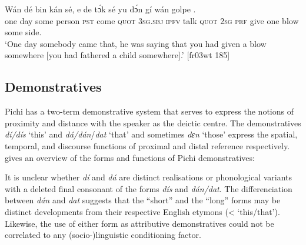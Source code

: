 \ea%
    \label{ex:key:191}
    \gll Wán    dé     bin  kán    sé,    e    de
tɔ́k  sé    yu  dɔ́n  gí  wán    golpe   .\\
one    day  some  person  \textsc{pst}  come  \textsc{quot}    \textsc{3sg.sbj}  \textsc{ipfv}
talk  \textsc{quot}    \textsc{2sg}  \textsc{prf}  give  one    blow  some  side.\\

\glt ‘One day somebody came that, he was saying that you had given a blow
somewhere [you had fathered a child somewhere].’ [fr03wt 185]
\z

\subsection{Demonstratives}

Pichi has a two-term demonstrative system that serves to express the notions of proximity and distance with the speaker as the deictic centre. The demonstratives \textit{dí/dís} ‘this’\textit{} and \textit{dá}\textit{\textup{/}}\textit{dán}/\textit{dat} ‘that’ and sometimes \textit{dɛn} ‘those’ express the spatial, temporal, and discourse functions of proximal and distal reference respectively.  gives an overview of the forms and functions of Pichi demonstratives:

\begin{table}
\caption{Demonstratives}
\label{tab:key:5.2}

\end{table}
It is unclear whether \textit{dí} and \textit{dá} are distinct realisations or phonological variants with a deleted final consonant of the forms \textit{dís} and \textit{dán}\textit{\textup{/}}\textit{dat}. The differenciation between \textit{dán} and \textit{dat} suggests that the “short” and the “long” forms may be distinct developments from their respective English etymons (< ‘this/that’). Likewise, the use of either form as attributive demonstratives could not be correlated to any (socio-)linguistic conditioning factor. 


